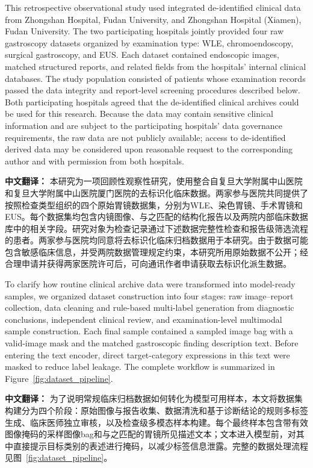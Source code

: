 \documentclass[Afour,sagev,times]{sagej}
\begin{document}
This retrospective observational study used integrated de-identified clinical data from Zhongshan Hospital, Fudan University, and Zhongshan Hospital (Xiamen), Fudan University. The two participating hospitals jointly provided four raw gastroscopy datasets organized by examination type: WLE, chromoendoscopy, surgical gastroscopy, and EUS. Each dataset contained endoscopic images, matched structured reports, and related fields from the hospitals' internal clinical databases. The study population consisted of patients whose examination records passed the data integrity and report-level screening procedures described below. Both participating hospitals agreed that the de-identified clinical archives could be used for this research. Because the data may contain sensitive clinical information and are subject to the participating hospitals' data governance requirements, the raw data are not publicly available; access to de-identified derived data may be considered upon reasonable request to the corresponding author and with permission from both hospitals.

\textbf{中文翻译：} 本研究为一项回顾性观察性研究，使用整合自复旦大学附属中山医院和复旦大学附属中山医院厦门医院的去标识化临床数据。两家参与医院共同提供了按照检查类型组织的四个原始胃镜数据集，分别为WLE、染色胃镜、手术胃镜和EUS。每个数据集均包含内镜图像、与之匹配的结构化报告以及两院内部临床数据库中的相关字段。研究对象为检查记录通过下述数据完整性检查和报告级筛选流程的患者。两家参与医院均同意将去标识化临床归档数据用于本研究。由于数据可能包含敏感临床信息，并受两院数据管理规定约束，本研究所用原始数据不公开；经合理申请并获得两家医院许可后，可向通讯作者申请获取去标识化派生数据。

To clarify how routine clinical archive data were transformed into model-ready samples, we organized dataset construction into four stages: raw image--report collection, data cleaning and rule-based multi-label generation from diagnostic conclusions, independent clinical review, and examination-level multimodal sample construction. Each final sample contained a sampled image bag with a valid-image mask and the matched gastroscopic finding description text. Before entering the text encoder, direct target-category expressions in this text were masked to reduce label leakage. The complete workflow is summarized in Figure~\ref{fig:dataset_pipeline}.

\textbf{中文翻译：} 为了说明常规临床归档数据如何转化为模型可用样本，本文将数据集构建分为四个阶段：原始图像与报告收集、数据清洗和基于诊断结论的规则多标签生成、临床医师独立审核，以及检查级多模态样本构建。每个最终样本包含带有效图像掩码的采样图像bag和与之匹配的胃镜所见描述文本；文本进入模型前，对其中直接提示目标类别的表述进行掩码，以减少标签信息泄露。完整的数据处理流程见图~\ref{fig:dataset_pipeline}。
\end{document}
